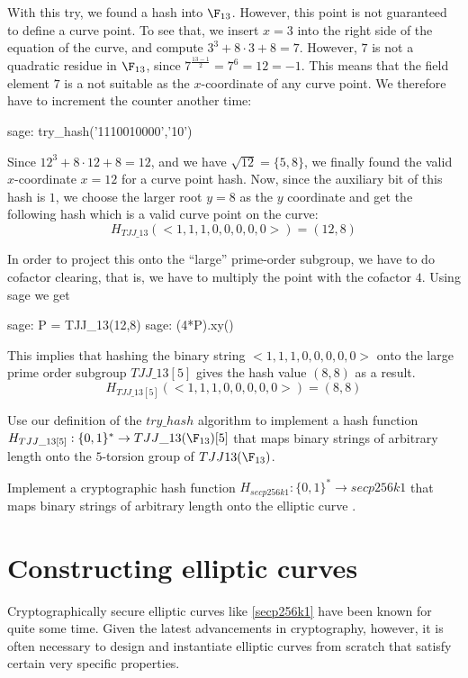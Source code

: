 \begin{example}
With this try, we found a hash into $\F_{13}$. However, this point is not guaranteed to define a curve point. To see that, we insert $x=3$ into the right side of the  equation of the  curve, and compute $3^3 + 8\cdot 3 + 8 = 7$. However, $7$ is not a quadratic residue in $\F_{13}$, since $7^{\frac{13-1}{2}}=7^6=12=-1$. This means that the field element $7$ is a not suitable as the $x$-coordinate of any curve point. We therefore have to increment the counter another time: 
\begin{sagecommandline}
sage: try_hash('1110010000','10')
\end{sagecommandline}
Since $12^3 + 8\cdot 12 + 8 = 12$, and we have $\sqrt{12} = \{5, 8\}$, we finally found the valid $x$-coordinate $x=12$ for a curve point hash. Now, since the auxiliary bit of this hash is $1$, we choose the larger root $y=8$ as the $y$ coordinate and get the following hash which is a valid curve point on the  curve:
$$
H_{TJJ\_13}(<1,1,1,0,0,0,0,0>) = (12,8)
$$

In order to project this onto the ``large'' prime-order subgroup, we have to do cofactor clearing, that is, we have to multiply the point with the cofactor $4$. Using sage we get
\begin{sagecommandline}
sage: P = TJJ_13(12,8)
sage: (4*P).xy()
\end{sagecommandline}

This implies that hashing the binary string $<1,1,1,0,0,0,0,0>$ onto the large prime order subgroup $TJJ\_13[5]$ gives the hash value $(8,8)$ as a result. 
$$
H_{TJJ\_13[5]}(<1,1,1,0,0,0,0,0>) = (8,8)
$$
\end{example}
\begin{exercise}
Use our definition of the $try\_hash$ algorithm to implement a hash function $H_{TJJ\_13[5]} : \{0,1\}^*\to TJJ\_13(\F_{13})[5]$ that maps binary strings of arbitrary length onto the $5$-torsion group of $TJJ13(\F_{13})$. 
\end{exercise}
\begin{exercise}
Implement a cryptographic hash function $H_{secp256k1} : \{0,1\}^*\to secp256k1$ that maps binary strings of arbitrary length onto the elliptic curve . 
\end{exercise}
\section{Constructing elliptic curves} Cryptographically secure elliptic curves like  \ref{secp256k1} have been known for quite some time. Given the latest advancements in cryptography, however, it is often necessary to design and instantiate elliptic curves from scratch that satisfy certain very specific properties. 

